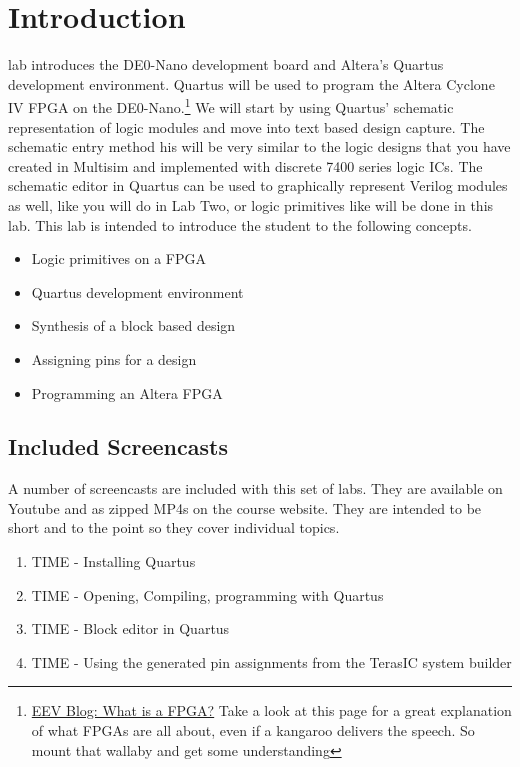   \section{Introduction}
     lab introduces the DE0-Nano development board and Altera's Quartus development environment. Quartus will be used to program the Altera Cyclone IV FPGA on the DE0-Nano.\footnote{\href{https://www.youtube.com/watch?v=gUsHwi4M4xE}{EEV Blog: What is a FPGA?} Take a look at this page for a great explanation of what FPGAs are all about, even if a kangaroo delivers the speech. So mount that wallaby and get some understanding} We will start by using Quartus' schematic representation of logic modules and move into text based design capture. The schematic entry method his will be very similar to the logic designs that you have created in Multisim and implemented with discrete 7400 series logic ICs. The schematic editor in Quartus can be used to graphically represent Verilog modules as well, like you will do in Lab Two, or logic primitives like will be done in this lab. This lab is intended to introduce the student to the following concepts.
    \begin{itemize}
       \item Logic primitives on a FPGA
       \item Quartus development environment
       \item Synthesis of a block based design
       \item Assigning pins for a design
       \item Programming an Altera FPGA
    \end{itemize}

    \subsection{Included Screencasts}
      A number of screencasts are included with this set of labs. They are available on Youtube and as zipped MP4s on the course website. They are intended to be short and to the point so they cover individual topics.
      \begin{enumerate}
        \item TIME - Installing Quartus
        \item TIME - Opening, Compiling, programming with Quartus
        \item TIME - Block editor in Quartus
        \item TIME - Using the generated pin assignments from the TerasIC system builder
      \end{enumerate}

